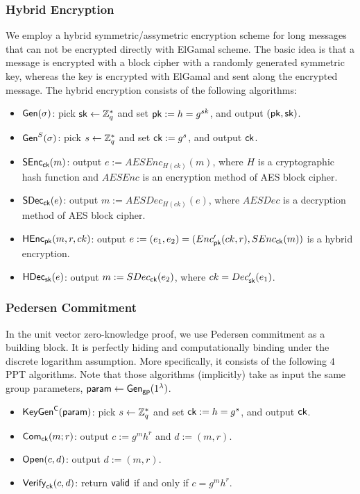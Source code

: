 \subsubsection{Hybrid Encryption}
We employ a hybrid symmetric/assymetric encryption scheme for long messages that can not be encrypted directly with ElGamal  scheme. The basic idea is that a message is encrypted with a block cipher with a randomly generated symmetric key, whereas the key is encrypted with ElGamal and sent along the encrypted message. The hybrid encryption consists of the following algorithms:
\begin{itemize}
	\item $\mathsf{Gen}(\sigma)$: pick $\mathsf{sk}\leftarrow \mathbb{Z}_q^*$ and set $\mathsf{pk}:=h=g^{sk}$, and output $(\mathsf{pk},\mathsf{sk})$. 
	\item $\mathsf{Gen}^S(\sigma)$: pick $s\leftarrow \mathbb{Z}_q^*$ and set $\mathsf{ck}:=g^{s}$, and output $\mathsf{ck}$. 
	\item $\mathsf{SEnc}_{\mathsf{ck}}(m)$: output $e:=AESEnc_{H(ck)}(m)$, where $H$ is a cryptographic hash function and $AESEnc$ is an encryption method of AES block cipher.
	\item $\mathsf{SDec}_{\mathsf{ck}}(e)$: output $m:=AESDec_{H(ck)}(e)$, where $AESDec$ is a decryption method of AES block cipher.
	\item $\mathsf{HEnc}_{\mathsf{pk}}(m,r,ck)$: output $e:=(e_1,e_2)=(Enc'_{\mathsf{pk}}(ck,r), SEnc_{\mathsf{ck}}(m))$ is a hybrid encryption.
	\item $\mathsf{HDec}_{\mathsf{sk}}(e)$: output $m:=SDec_{\mathsf{ck}}(e_2)$, where $ck=Dec'_{\mathsf{sk}}(e_1)$.
\end{itemize}

\subsubsection{Pedersen Commitment}
In the unit vector zero-knowledge proof, we use Pedersen commitment as a building block. It is perfectly hiding and computationally binding under the discrete logarithm assumption. 
More specifically, it consists of the following $4$ PPT algorithms. Note that those algorithms (implicitly) take as input the same group parameters, $\mathsf{param}\leftarrow \mathsf{Gen}_{\mathsf{gp}}(1^{\lambda})$. 

\begin{itemize}
\item $\mathsf{KeyGen}^{\mathsf{C}}(\mathsf{param})$: pick $s\leftarrow \mathbb{Z}_q^*$ and set $\mathsf{ck}:=h=g^{s}$, and output $\mathsf{ck}$. 
\item $\mathsf{Com}_{\mathsf{ck}}(m;r)$: output $c:=g^m h^r$ and $d:=(m,r)$.
\item $\mathsf{Open}(c, d)$: output $d:=(m,r)$. 
\item $\mathsf{Verify}_{\mathsf{ck}}(c,d)$: return $\mathsf{valid}$ if and only if  $c = g^m h^r$.
\end{itemize}

